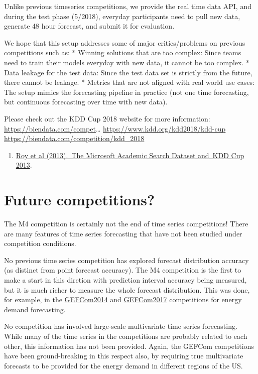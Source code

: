 \documentclass[11pt,a4paper,]{article}
\providecommand{\tightlist}{%
  \setlength{\itemsep}{0pt}\setlength{\parskip}{0pt}}
\begin{document}
Unlike previous timeseries competitions, we provide the real time data API, and during the test phase (5/2018), everyday participants need to pull new data, generate 48 hour forecast, and submit it for evaluation.

We hope that this setup addresses some of major critics/problems on previous competitions such as:
* Winning solutions that are too complex: Since teams need to train their models everyday with new data, it cannot be too complex.
* Data leakage for the test data: Since the test data set is strictly from the future, there cannot be leakage.
* Metrics that are not aligned with real world use cases: The setup mimics the forecasting pipeline in practice (not one time forecasting, but continuous forecasting over time with new data).

Please check out the KDD Cup 2018 website for more information: \url{https://biendata.com/compet}\ldots{}
\url{https://www.kdd.org/kdd2018/kdd-cup}
\url{https://biendata.com/competition/kdd_2018}

\begin{enumerate}
\def\labelenumi{\arabic{enumi}.}
\setcounter{enumi}{1}
\tightlist
\item
  \href{http://www.kdd.org/kddcup2013/sites/default/files/papers/papers.pdf}{Roy et al (2013).~The Microsoft Academic Search Dataset and~KDD Cup 2013}.
\end{enumerate}

\hypertarget{future-competitions}{%
\section{Future competitions?}\label{future-competitions}}

The M4 competition is certainly not the end of time series competitions! There are many features of time series forecasting that have not been studied under competition conditions.

No previous time series competition has explored forecast distribution accuracy (as distinct from point forecast accuracy). The M4 competition is the first to make a start in this diretion with prediction interval accuracy being measured, but it is much richer to measure the whole forecast distribution. This was done, for example, in the \href{http://www.drhongtao.com/gefcom/2014}{GEFCom2014} and \href{http://www.drhongtao.com/gefcom/2017}{GEFCom2017} competitions for energy demand forecasting.

No competition has involved large-scale multivariate time series forecasting. While many of the time series in the competitions are probably related to each other, this information has not been provided. Again, the GEFCom competitions have been ground-breaking in this respect also, by requiring true multivariate forecasts to be provided for the energy demand in different regions of the US.
\end{document}
